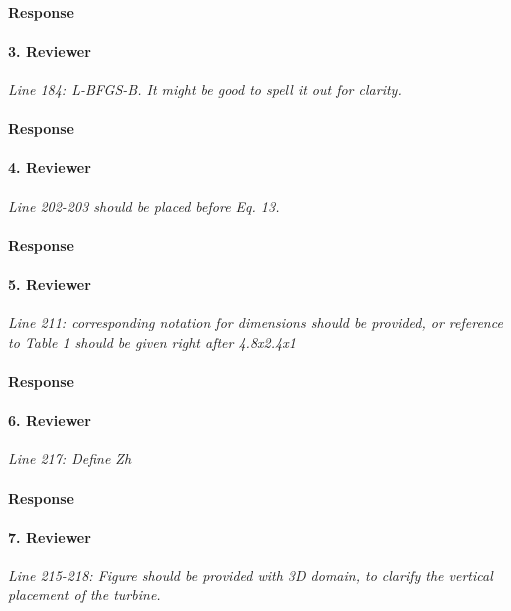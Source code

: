 \documentclass[]{article}
\begin{document}
\paragraph{Response} 

\hrulefill

\paragraph{3. Reviewer} \textit{Line 184: L-BFGS-B. It might be good to spell it out for clarity.}

\paragraph{Response} 

\hrulefill

\paragraph{4. Reviewer} \textit{Line 202-203 should be placed before Eq. 13.}

\paragraph{Response} 

\hrulefill

\paragraph{5. Reviewer} \textit{Line 211: corresponding notation for dimensions should be provided, or reference to Table 1 should be given right after 4.8x2.4x1}

\paragraph{Response} 

\hrulefill

\paragraph{6. Reviewer} \textit{Line 217: Define Zh}

\paragraph{Response} 

\hrulefill

\paragraph{7. Reviewer} \textit{Line 215-218: Figure should be provided with 3D domain, to clarify the vertical placement of the turbine.}
\end{document}
